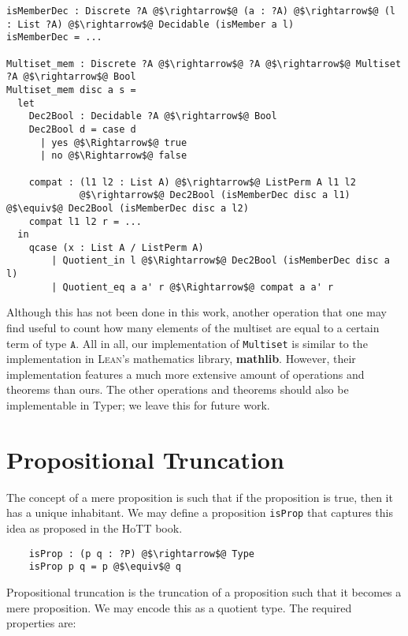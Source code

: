 \documentclass[12pt,twoside,maitrise]{dms}
\theoremstyle{definition}
\numberwithin{equation}{section}
\numberwithin{table}{chapter}
\numberwithin{figure}{chapter}
\newcommand\id[1] {\texttt{#1}}
\newcommand\fn[1] {\texttt{#1}}
\def\Lean{\textsc{Lean}\xspace}
\begin{document}
\begin{verbatim}
isMemberDec : Discrete ?A @$\rightarrow$@ (a : ?A) @$\rightarrow$@ (l : List ?A) @$\rightarrow$@ Decidable (isMember a l)
isMemberDec = ...

Multiset_mem : Discrete ?A @$\rightarrow$@ ?A @$\rightarrow$@ Multiset ?A @$\rightarrow$@ Bool
Multiset_mem disc a s =
  let
    Dec2Bool : Decidable ?A @$\rightarrow$@ Bool
    Dec2Bool d = case d
      | yes @$\Rightarrow$@ true
      | no @$\Rightarrow$@ false

    compat : (l1 l2 : List A) @$\rightarrow$@ ListPerm A l1 l2
             @$\rightarrow$@ Dec2Bool (isMemberDec disc a l1) @$\equiv$@ Dec2Bool (isMemberDec disc a l2)
    compat l1 l2 r = ...
  in
    qcase (x : List A / ListPerm A)
        | Quotient_in l @$\Rightarrow$@ Dec2Bool (isMemberDec disc a l)
        | Quotient_eq a a' r @$\Rightarrow$@ compat a a' r
\end{verbatim}

Although this has not been done in this work, another operation that one may
find useful to count how many elements of the multiset are equal to a certain
term of type $\fn{A}$. All in all, our implementation of \id{Multiset} is
similar to the implementation in \Lean{}'s mathematics library,
\textbf{mathlib}\cite{lean-mathlib}. However, their implementation features a
much more extensive amount of operations and theorems than ours. The other
operations and theorems should also be implementable in Typer; we leave this
for future work.

\section{Propositional Truncation}\label{sec:prop-trunc}

The concept of a mere proposition is such that if the proposition is true, then
it has a unique inhabitant. We may define a proposition \id{isProp} that
captures this idea as proposed in the HoTT book\cite[Chap~3.3]{HoTTbook}.

\begin{verbatim}
    isProp : (p q : ?P) @$\rightarrow$@ Type
    isProp p q = p @$\equiv$@ q
\end{verbatim}

Propositional truncation is the truncation of a proposition such that it becomes
a mere proposition. We may encode this as a quotient type. The required properties
are:
\end{document}
